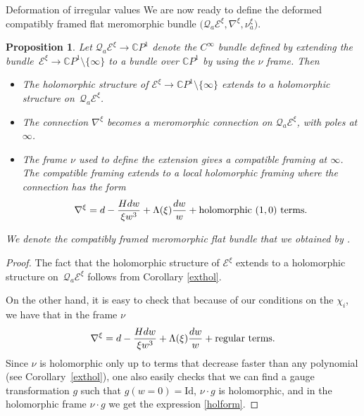 \documentclass[11pt]{article}
\numberwithin{equation}{section}
\newtheorem{Proposition}[Theorem]{Proposition}
 { \theoremstyle{definition}
\newtheorem{Definition}[Theorem]{Definition}
\newtheorem{Notation}[Theorem]{Notation}
\newtheorem{Example}[Theorem]{Example}
\newtheorem{Remark}[Theorem]{Remark} }
\numberwithin{equation}{section}
\newcommand{\CP}{\mathbb{C}P^1}
\begin{document}
\begin{subsubsection}{Deformation of irregular values}
We are now ready to define the deformed compatibly framed flat meromorphic bundle $\bigl(\mathcal{Q}_a\mathcal{E}^{\xi},\nabla^{\xi},\nu^{\xi}_{a}\bigr)$.

\begin{Proposition} Let $\mathcal{Q}_a\mathcal{E}^{\xi}\to \CP$ denote the $C^{\infty}$ bundle defined by extending the bundle~${\mathcal{E}^{\xi} \to \CP \setminus \{\infty\}}$ to a bundle over $\CP$ by using the $\nu$ frame. Then
\begin{itemize}\itemsep=0pt
 \item The holomorphic structure of $\mathcal{E}^{\xi} \to \CP \setminus \{\infty\}$ extends to a holomorphic structure on~$\mathcal{Q}_a\mathcal{E}^{\xi}$.
 \item The connection $\nabla^{\xi}$ becomes a meromorphic connection on $\mathcal{Q}_a\mathcal{E}^{\xi}$, with poles at $\infty$.
 \item The frame $\nu$ used to define the extension gives a compatible framing at $\infty$. The compatible framing extends to a local holomorphic framing where the connection has the form
 \begin{equation}\label{holform}
 \nabla^{\xi}= {\rm d}-\frac{H{\rm d}w}{\xi w^3}+\Lambda(\xi)\frac{{\rm d}w}{w} + \text{holomorphic $(1,0)$ terms}.
 \end{equation}
\end{itemize}
We denote the compatibly framed meromorphic flat bundle that we obtained by .
\end{Proposition}

\begin{proof}
The fact that the holomorphic structure of $\mathcal{E}^{\xi}$ extends to a holomorphic structure on~$\mathcal{Q}_a\mathcal{E}^{\xi}$ follows from Corollary \ref{exthol}.

On the other hand, it is easy to check that because of our conditions on the $\chi_i$, we have that in the frame $\nu$
\begin{equation*}
 \nabla^{\xi}= {\rm d}-\frac{H{\rm d}w}{\xi w^3}+\Lambda(\xi)\frac{{\rm d}w}{w} + \text{regular terms}.
\end{equation*}
Since $\nu$ is holomorphic only up to terms that decrease faster than any polynomial (see Corollary~\ref{exthol}), one also easily checks that we can find a gauge transformation $g$ such that $g(w=0)=\text{Id}$, $\nu \cdot g$ is holomorphic, and in the holomorphic frame $\nu \cdot g$ we get the expression \eqref{holform}.


\end{proof}
\end{subsubsection}
\end{document}
